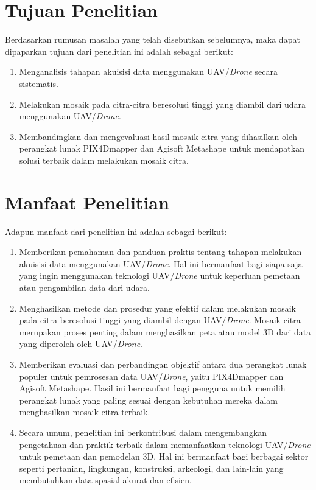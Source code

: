 \section{Tujuan Penelitian}
Berdasarkan rumusan masalah yang telah disebutkan sebelumnya, maka dapat dipaparkan tujuan dari penelitian ini adalah sebagai berikut:
\begin{enumerate}
	\item Menganalisis tahapan akuisisi data menggunakan UAV/\textit{Drone} secara sistematis.
	\item Melakukan mosaik pada citra-citra beresolusi tinggi yang diambil dari udara menggunakan UAV/\textit{Drone}.
	\item Membandingkan dan mengevaluasi hasil mosaik citra yang dihasilkan oleh perangkat lunak PIX4Dmapper dan Agisoft Metashape untuk mendapatkan solusi terbaik dalam melakukan mosaik citra.

\end{enumerate}


\section{Manfaat Penelitian}
Adapun manfaat dari penelitian ini adalah sebagai berikut:
\begin{enumerate}
	\item Memberikan pemahaman dan panduan praktis tentang tahapan melakukan akuisisi data menggunakan UAV/\textit{Drone}. Hal ini bermanfaat bagi siapa saja yang ingin menggunakan teknologi UAV/\textit{Drone} untuk keperluan pemetaan atau pengambilan data dari udara.

	\item Menghasilkan metode dan prosedur yang efektif dalam melakukan mosaik pada citra beresolusi tinggi yang diambil dengan UAV/\textit{Drone}. Mosaik citra merupakan proses penting dalam menghasilkan peta atau model 3D dari data yang diperoleh oleh UAV/\textit{Drone}.

	\item Memberikan evaluasi dan perbandingan objektif antara dua perangkat lunak populer untuk pemrosesan data UAV/\textit{Drone}, yaitu PIX4Dmapper dan Agisoft Metashape. Hasil ini bermanfaat bagi pengguna untuk memilih perangkat lunak yang paling sesuai dengan kebutuhan mereka dalam menghasilkan mosaik citra terbaik.

        \item Secara umum, penelitian ini berkontribusi dalam mengembangkan pengetahuan dan praktik terbaik dalam memanfaatkan teknologi UAV/\textit{Drone} untuk pemetaan dan pemodelan 3D. Hal ini bermanfaat bagi berbagai sektor seperti pertanian, lingkungan, konstruksi, arkeologi, dan lain-lain yang membutuhkan data spasial akurat dan efisien.

\end{enumerate}



\begin{comment}

\end{comment}
